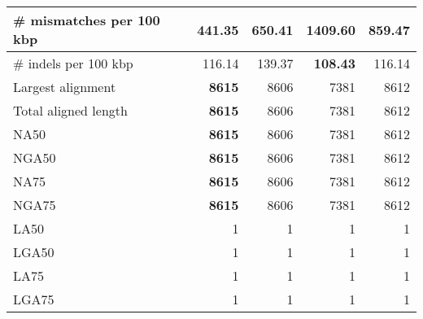 \documentclass[12pt,a4paper]{article}
\begin{document}
\begin{table}[ht]
\begin{center}
\begin{tabular}{|l*{4}{|r}|}
\# mismatches per 100 kbp & {\bf 441.35} & 650.41 & 1409.60 & 859.47 \\ \hline
\# indels per 100 kbp & 116.14 & 139.37 & {\bf 108.43} & 116.14 \\ \hline
Largest alignment & {\bf 8615} & 8606 & 7381 & 8612 \\ \hline
Total aligned length & {\bf 8615} & 8606 & 7381 & 8612 \\ \hline
NA50 & {\bf 8615} & 8606 & 7381 & 8612 \\ \hline
NGA50 & {\bf 8615} & 8606 & 7381 & 8612 \\ \hline
NA75 & {\bf 8615} & 8606 & 7381 & 8612 \\ \hline
NGA75 & {\bf 8615} & 8606 & 7381 & 8612 \\ \hline
LA50 & 1 & 1 & 1 & 1 \\ \hline
LGA50 & 1 & 1 & 1 & 1 \\ \hline
LA75 & 1 & 1 & 1 & 1 \\ \hline
LGA75 & 1 & 1 & 1 & 1 \\ \hline
\end{tabular}
\end{center}
\end{table}
\end{document}

